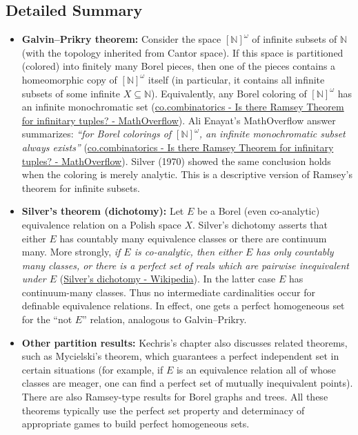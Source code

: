 \documentclass[11pt]{article}
\begin{document}
\subsection{Detailed Summary}
\label{detailed-summary-9}
\begin{itemize}
\item \textbf{Galvin--Prikry theorem:} Consider the space \([\mathbb{N}]^\omega\)
of infinite subsets of \(\mathbb{N}\) (with the topology inherited
from Cantor space). If this space is partitioned (colored) into
finitely many Borel pieces, then one of the pieces contains a
homeomorphic copy of \([\mathbb{N}]^\omega\) itself (in particular, it
contains all infinite subsets of some infinite
\(X\subseteq\mathbb{N}\)). Equivalently, any Borel coloring of
\([\mathbb{N}]^\omega\) has an infinite monochromatic set
(\href{https://mathoverflow.net/questions/67483/is-there-ramsey-theorem-for-infinitary-tuples\#:\~:text=In\%20contrast\%2C\%20Galvin\%20and\%20Prikry,Bbb\%7BN}{co.combinatorics -
Is there Ramsey Theorem for infinitary tuples? - MathOverflow}). Ali
Enayat's MathOverflow answer summarizes: \emph{“for Borel colorings of
\([\mathbb{N}]^\omega\), an infinite monochromatic subset always
exists”}
(\href{https://mathoverflow.net/questions/67483/is-there-ramsey-theorem-for-infinitary-tuples\#:\~:text=In\%20contrast\%2C\%20Galvin\%20and\%20Prikry,Bbb\%7BN}{co.combinatorics -
Is there Ramsey Theorem for infinitary tuples? - MathOverflow}).
Silver (1970) showed the same conclusion holds when the coloring is
merely analytic. This is a descriptive version of Ramsey's theorem for
infinite subsets.

\item \textbf{Silver's theorem (dichotomy):} Let \(E\) be a Borel (even
co-analytic) equivalence relation on a Polish space \(X\). Silver's
dichotomy asserts that either \(E\) has countably many equivalence
classes or there are continuum many. More strongly, \emph{if \(E\) is
co-analytic, then either \(E\) has only countably many classes, or
there is a perfect set of reals which are pairwise inequivalent under
\(E\)}
(\href{https://en.wikipedia.org/wiki/Silver\%27s\_dichotomy\#:\~:text=A\%20relation\%20is\%20said\%20to,2}{Silver's
dichotomy - Wikipedia}). In the latter case \(E\) has continuum-many
classes. Thus no intermediate cardinalities occur for definable
equivalence relations. In effect, one gets a perfect homogeneous set
for the “not \(E\)” relation, analogous to Galvin--Prikry.

\item \textbf{Other partition results:} Kechris's chapter also discusses related
theorems, such as Mycielski's theorem, which guarantees a perfect
independent set in certain situations (for example, if \(E\) is an
equivalence relation all of whose classes are meager, one can find a
perfect set of mutually inequivalent points). There are also
Ramsey-type results for Borel graphs and trees. All these theorems
typically use the perfect set property and determinacy of appropriate
games to build perfect homogeneous sets.


\end{itemize}
\end{document}
